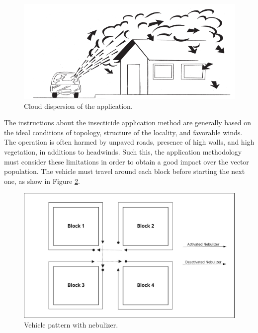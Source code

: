 \documentclass[a4paper,11pt]{article}
\begin{document}
\begin{figure}[!ht]
  \centering
  \includegraphics[scale=0.4]{cloud-dispersion.png}
  \caption{Cloud dispersion of the application.}
  \label{fig:dispersion}
\end{figure}

The instructions about the insecticide application method are generally based on
the  ideal conditions  of topology,  structure  of the  locality, and  favorable
winds. The operation  is often harmed by unpaved roads,  presence of high walls,
and  high vegetation,  in additions  to  headwinds. Such  this, the  application
methodology must  consider these limitations  in order  to obtain a  good impact
over the  vector population. The  vehicle must  travel around each  block before
starting the next one, as show in Figure \ref{fig:travel-pattern}.

\begin{figure}[!ht]
  \centering
  \includegraphics[scale=0.23]{visit-pattern.jpg}
  \caption{Vehicle pattern with nebulizer.}
  \label{fig:travel-pattern}
\end{figure}
\end{document}
